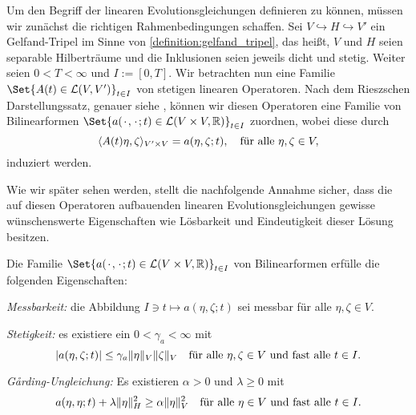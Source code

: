 \documentclass[../main.tex]{subfiles}
\begin{document}
Um den Begriff der linearen Evolutionsgleichungen definieren zu können, müssen wir zunächst die richtigen Rahmenbedingungen schaffen.
Sei $V \hookrightarrow H \hookrightarrow V'$ ein Gelfand-Tripel im Sinne von \cref{definition:gelfand_tripel}, das heißt, $V$ und $H$ seien separable Hilberträume und die Inklusionen seien jeweils dicht und stetig.
Weiter seien $0 < T < \infty$ und $I := [0, T]$.
Wir betrachten nun eine Familie $\Set{A(t) \in \mathcal L(V, V')}_{t \in I}$ von stetigen linearen Operatoren.
Nach dem Rieszschen Darstellungssatz, genauer siehe \cite[Theorem \S{}22.1]{Halmos:1957vd}, können wir diesen Operatoren eine Familie von Bilinearformen $\Set{a(\blank, \blank; t) \in \mathcal L(V \times V, \mathbb{R})}_{t \in I}$ zuordnen, wobei diese durch
\begin{equation}
    \skp{A(t)\eta}{\zeta}{V' \times V} = a(\eta, \zeta; t), \quad \fa \eta, \zeta \in V,
\end{equation}
induziert werden.

Wie wir später sehen werden, stellt die nachfolgende Annahme sicher, dass die auf diesen Operatoren aufbauenden linearen Evolutionsgleichungen gewisse wünschenswerte Eigenschaften wie Lösbarkeit und Eindeutigkeit dieser Lösung besitzen.

\begin{Annahme}
\label{annahme:eigenschaften_der_bilinearform_a}
    Die Familie $\Set{a(\blank, \blank; t) \in \mathcal L(V \times V, \mathbb{R})}_{t \in I}$ von Bilinearformen erfülle die folgenden Eigenschaften:
    \leavevmode
    \begin{thmenumerate}
        \item \emph{Messbarkeit:} die Abbildung $I \ni t \mapsto a(\eta, \zeta; t)$ sei messbar für alle $\eta, \zeta \in V$.
        \item \emph{Stetigkeit:}
        es existiere ein $0 < \gamma_{a} < \infty$ mit
        \begin{equation}
            \label{eq:eigenschaften_der_bilinearform_a:stetigkeit}
            \abs{a(\eta, \zeta; t)} \leq \gamma_{a} \norm{\eta}_{V} \norm{\zeta}_{V} \quad \fa \eta, \zeta \in V \text{ und fast alle } t \in I.
        \end{equation}
        \item \emph{G\r{a}rding-Ungleichung:}
        Es existieren $\alpha > 0$ und $\lambda \geq 0$ mit
        \begin{equation}
            \label{eq:eigenschaften_der_bilinearform_a:garding}
            a(\eta, \eta; t) + \lambda \norm{\eta}_{H}^{2} \geq \alpha \norm{\eta}_{V}^{2} \quad \fa \eta \in V \text{ und fast alle } t \in I.
        \end{equation}
    \end{thmenumerate}
\end{Annahme}
\end{document}
